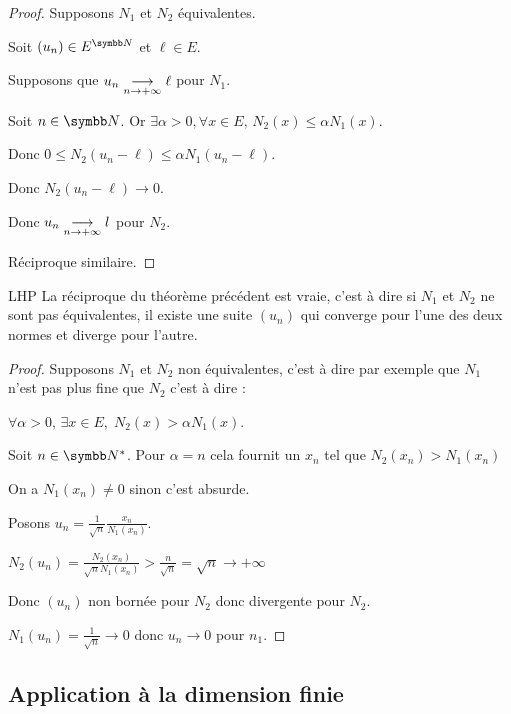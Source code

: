 \begin{proof}
    Supposons $N_1$ et $N_2$ équivalentes.

    Soit $(u_n) \in E^{\N}$ et $\ell \in E$.

    Supposons que $u_n \underset{n \to +\infty}{\longrightarrow} \ell$ pour $N_1$. 

    Soit $n \in \N$. 
    Or $\exists \alpha > 0, \forall x \in E, \, N_2(x) \leqslant \alpha N_1(x)$.

    Donc $0 \leqslant N_2(u_n - \ell) \leqslant \alpha N_1(u_n - \ell)$.

    Donc $N_2(u_n - \ell) \to 0$.

    Donc $u_n \underset{n \to +\infty}{\longrightarrow} l$ pour $N_2$.

    Réciproque similaire.
\end{proof}

\begin{theoreme}{LHP}{}
    La réciproque du théorème précédent est vraie, c'est à dire si $N_1$ et $N_2$ ne sont pas 
    équivalentes, il existe une suite $(u_n)$ qui converge pour l'une des deux normes 
    et diverge pour l'autre. 
\end{theoreme}


\begin{proof}
    Supposons $N_1$ et $N_2$ non équivalentes, c'est à dire par exemple que $N_1$ n'est pas plus 
    fine que $N_2$ c'est à dire : 

    $\forall \alpha >0, \, \exists x \in E, \; N_2(x) > \alpha N_1(x)$.

    Soit $n \in \N^*$. Pour $\alpha = n$ cela fournit un $x_n$ tel que $N_2(x_n) > N_1(x_n)$

    On a $N_1(x_n) \neq 0$ sinon c'est absurde.

    Posons $\displaystyle u_n = \frac 1 {\sqrt n}\frac{x_n}{N_1(x_n)}$.

    $\displaystyle N_2(u_n) = \frac{N_2(x_n)}{\sqrt n N_1(x_n)} > \frac n {\sqrt n} = \sqrt n \to + \infty$

    Donc $(u_n)$ non bornée pour $N_2$ donc divergente pour $N_2$. 

    $N_1(u_n) =  \frac 1 {\sqrt n} \to 0$ donc $u_n \to 0$ pour $n_1$.
\end{proof}

\subsection{Application à la dimension finie}


